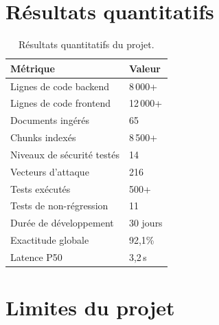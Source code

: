 \documentclass[12pt,a4paper,oneside]{report}
\begin{document}
\section{R\'{e}sultats quantitatifs}



\begin{table}[htbp]\centering

\begin{tabular}{@{}ll@{}}

\toprule

\textbf{M\'{e}trique} & \textbf{Valeur} \\

\midrule

Lignes de code backend & 8\,000+ \\

Lignes de code frontend & 12\,000+ \\

Documents ing\'{e}r\'{e}s & 65 \\

Chunks index\'{e}s & 8\,500+ \\

Niveaux de s\'{e}curit\'{e} test\'{e}s & 14 \\

Vecteurs d'attaque & 216 \\

Tests ex\'{e}cut\'{e}s & 500+ \\

Tests de non-r\'{e}gression & 11 \\

Dur\'{e}e de d\'{e}veloppement & 30 jours \\

Exactitude globale & 92,1\% \\

Latence P50 & 3,2\,s \\

\bottomrule

\end{tabular}

\caption{R\'{e}sultats quantitatifs du projet.}\label{tab:resultats}

\end{table}



\section{Limites du projet}
\end{document}
